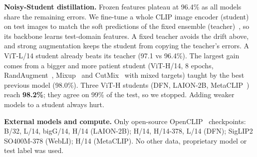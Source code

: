 \documentclass[10pt,twocolumn,letterpaper]{article}
\begin{document}
\textbf{Noisy-Student distillation.}
Frozen features plateau at 96.4\% as all models share the remaining errors.
We fine-tune a whole CLIP image encoder (student) on test images to match the soft predictions of the fixed ensemble (teacher)~\cite{xie2020self}, so its backbone learns test-domain features.
A fixed teacher avoids the drift above, and strong augmentation keeps the student from copying the teacher's errors.
A ViT-L/14 student already beats its teacher (97.1 vs 96.4\%).
The largest gain comes from a bigger and more patient student (ViT-H/14, 8 epochs, RandAugment~\cite{cubuk2020randaugment}, Mixup~\cite{zhang2018mixup} and CutMix~\cite{yun2019cutmix} with mixed targets) taught by the best previous model (98.0\%).
Three ViT-H students (DFN, LAION-2B, MetaCLIP~\cite{xu2024demystifying}) reach \textbf{98.2\%}; they agree on 99\% of the test, so we stopped.
Adding weaker models to a student always hurt.


\textbf{External models and compute.}
Only open-source OpenCLIP~\cite{cherti2023reproducible} checkpoints: B/32, L/14, bigG/14, H/14 (LAION-2B); H/14, H/14-378, L/14 (DFN); SigLIP2 SO400M-378 (WebLI); H/14 (MetaCLIP).
No other data, proprietary model or test label was used.

{
\small


}
\end{document}
